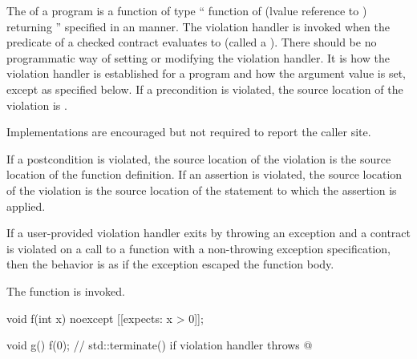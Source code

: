 \pnum
The  of a program is a function of type
`` function of
(lvalue reference to )
returning '' specified in an
 manner.
The violation handler is invoked
when the predicate of a checked contract evaluates to 
(called a ).
There should be no programmatic way of
setting or modifying the violation handler.
It is 
how the violation handler is established for a program and
how
the  argument value
is set,
except as specified below.
If a precondition is violated, the source location of the violation is
.
\begin{note}
Implementations are encouraged but not required to report the caller site.
\end{note}
If a postcondition is violated, the source location of the violation is
the source location of the function definition.
If an assertion is violated, the source location of the violation is
the source location of the statement to which the assertion is applied.

\pnum
If a user-provided violation handler exits by throwing an exception
and a contract is violated on a call to a function
with a non-throwing exception specification,
then the behavior is as if the exception escaped the function body.
\begin{note}
The function  is invoked.
\end{note}
\begin{example}
\begin{codeblock}
void f(int x) noexcept [[expects: x > 0]];

void g() {
  f(0);                                         // std::terminate() if violation handler throws
  @\commentellip@
}
\end{codeblock}
\end{example}

